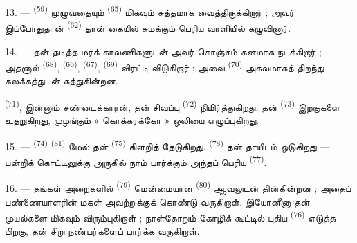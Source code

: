 13. ---  \textsuperscript{(59)} முழுவதையும்
 \textsuperscript{(65)} மிகவும் சுத்தமாக
வைத்திருக்கிறார் ; அவர் இப்போதுதான் 
\textsuperscript{(62)} தான் கையில் சுமக்கும் பெரிய வாளியில்
கழுவினார்.

\VUsaut{3.0mm}
\VUsaut{3.0mm}

14. --- தன் தடித்த மரக் காலணிகளுடன் அவர் கொஞ்சம் கனமாக நடக்கிறார் ;
அதனால்  \textsuperscript{(68)},  \textsuperscript{(66)}, 
\textsuperscript{(67)},  \textsuperscript{(69)}
விரட்டி விடுகிறார் ; அவை  \textsuperscript{(70)}
அகலமாகத் திறந்து கலக்கத்துடன் கத்துகின்றன.

 \textsuperscript{(71)}, இன்னும் சண்டைக்காரன், தன் சிவப்பு
 \textsuperscript{(72)} நிமிர்த்துகிறது, தன்
 \textsuperscript{(73)} இறகுகளை உதறுகிறது, முழங்கும்
« கொக்கரக்கோ » ஒலியை எழுப்புகிறது.

15. ---  \textsuperscript{(74)} 
\textsuperscript{(81)} மேல் தன் 
\textsuperscript{(75)} கிளறித் தேடுகிறது. 
\textsuperscript{(78)} தன் தாயிடம் ஓடுகிறது — பன்றிக் கொட்டிலுக்கு
அருகில் நாம் பார்க்கும் அந்தப் பெரிய 
\textsuperscript{(77)}.

16. --- தங்கள் அறைகளில்  \textsuperscript{(79)}
மென்மையான  \textsuperscript{(80)} ஆவலுடன் தின்கின்றன ;
அதைப் பண்ணையாளரின் மகள் அவற்றுக்குக் கொண்டு வருகிறாள். இயோனீனா தன்
முயல்களை மிகவும் விரும்புகிறாள் ; நாள்தோறும் கோழிக் கூட்டில் புதிய
 \textsuperscript{(76)} எடுத்த பிறகு, தன் சிறு
நண்பர்களைப் பார்க்க வருகிறாள்.

\VUsaut{6.0mm}
\VUfilet{22mm}
